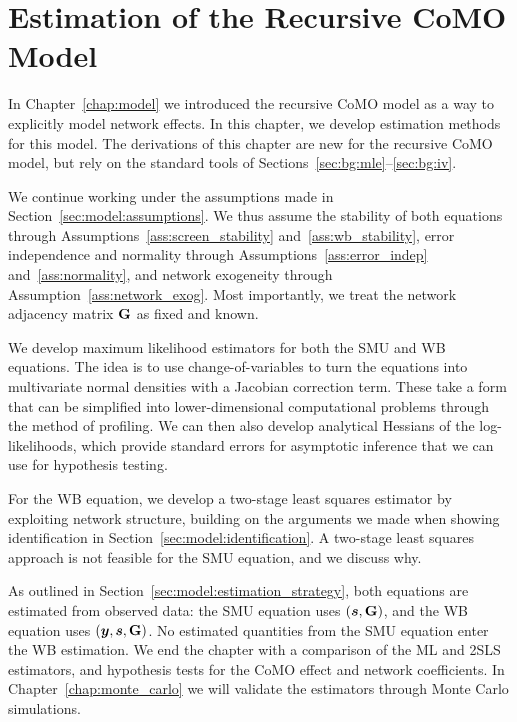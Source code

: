 
\chapter{Estimation of the Recursive CoMO Model}
\label{chap:estimation}
In Chapter~\ref{chap:model} we introduced the recursive CoMO model as a way to explicitly model network effects. In this chapter, we develop estimation methods for this model. The derivations of this chapter are new for the recursive CoMO model, but rely on the standard tools of Sections~\ref{sec:bg:mle}--\ref{sec:bg:iv}.

We continue working under the assumptions made in Section~\ref{sec:model:assumptions}. We thus assume the stability of both equations through Assumptions~\ref{ass:screen_stability} and~\ref{ass:wb_stability}, error independence and normality through Assumptions~\ref{ass:error_indep} and~\ref{ass:normality}, and network exogeneity through Assumption~\ref{ass:network_exog}. Most importantly, we treat the network adjacency matrix $\mathbf{G}$ as fixed and known.

We develop maximum likelihood estimators for both the SMU and WB equations. The idea is to use change-of-variables to turn the equations into multivariate normal densities with a Jacobian correction term. These take a form that can be simplified into lower-dimensional computational problems through the method of profiling. We can then also develop analytical Hessians of the log-likelihoods, which provide standard errors for asymptotic inference that we can use for hypothesis testing.

For the WB equation, we develop a two-stage least squares estimator by exploiting network structure, building on the arguments we made when showing identification in Section~\ref{sec:model:identification}. A two-stage least squares approach is not feasible for the SMU equation, and we discuss why. 

As outlined in Section~\ref{sec:model:estimation_strategy}, both equations are estimated from observed data: the SMU equation uses $(\bm{s}, \mathbf{G})$, and the WB equation uses $(\bm{y}, \bm{s}, \mathbf{G})$. No estimated quantities from the SMU equation enter the WB estimation. We end the chapter with a comparison of the ML and 2SLS estimators, and hypothesis tests for the CoMO effect and network coefficients. In Chapter~\ref{chap:monte_carlo} we will validate the estimators through Monte Carlo simulations.

